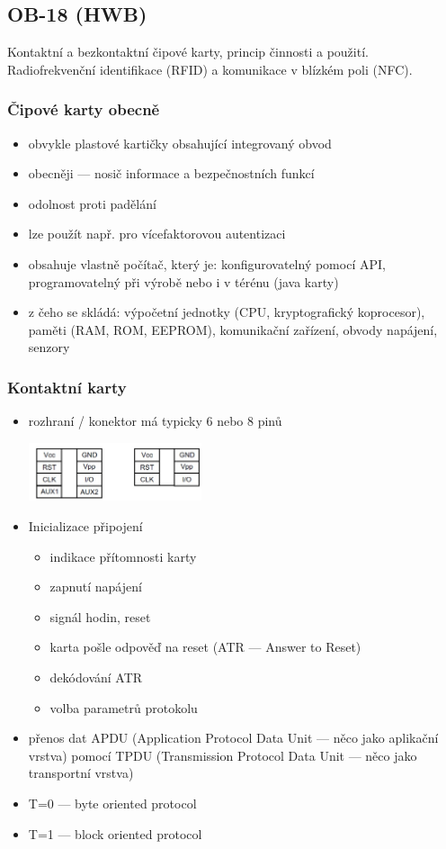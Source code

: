 \subsection{OB-18 (HWB)}
Kontaktní a bezkontaktní čipové karty, princip činnosti a použití. Radiofrekvenční identifikace (RFID) a komunikace v blízkém poli (NFC).

\subsubsection*{Čipové karty obecně}
\begin{itemize}
	\item obvykle plastové kartičky obsahující integrovaný obvod
	\item obecněji --- nosič informace a bezpečnostních funkcí
	\item odolnost proti padělání
	\item lze použít např. pro vícefaktorovou autentizaci
	\item obsahuje vlastně počítač, který je: konfigurovatelný pomocí API, programovatelný při výrobě nebo i v térénu (java karty)
	\item z čeho se skládá: výpočetní jednotky (CPU, kryptografický koprocesor), paměti (RAM, ROM, EEPROM), komunikační zařízení, obvody napájení, senzory
\end{itemize}

\subsubsection*{Kontaktní karty}
\begin{itemize}
	\item rozhraní / konektor má typicky 6 nebo 8 pinů
	
	\includegraphics[width=0.4\textwidth]{img/OB-18_0.jpg}
	
	\item Inicializace připojení
	\begin{itemize}
		\item indikace přítomnosti karty
		\item zapnutí napájení
		\item signál hodin, reset
		\item karta pošle odpověď na reset (ATR --- Answer to Reset)
		\item dekódování ATR
		\item volba parametrů protokolu
	\end{itemize}
	\item přenos dat APDU (Application Protocol Data Unit --- něco jako aplikační vrstva) pomocí TPDU (Trans\-mission Protocol Data Unit --- něco jako transportní vrstva)
	\item T=0 --- byte oriented protocol
	\item T=1 --- block oriented protocol
\end{itemize}

